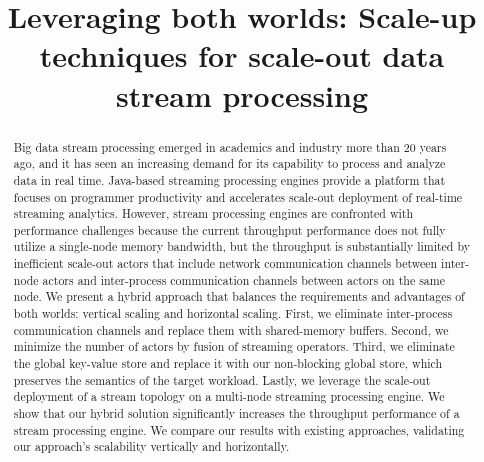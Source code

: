 \documentclass[runningheads]{llncs}
\begin{document}
%
\title{Leveraging both worlds: Scale-up techniques for scale-out data stream
processing}
%
%
%
\maketitle              %
%
\begin{abstract}
Big data stream processing emerged in academics and industry more than 20 years
ago, and it has seen an increasing demand for its capability to process and
analyze data in real time. Java-based streaming processing engines provide a
platform that focuses on programmer productivity and accelerates scale-out
deployment of real-time streaming analytics. However, stream processing engines
are confronted with performance challenges because the current throughput
performance does not fully utilize a single-node memory bandwidth, but the
throughput is substantially limited by inefficient scale-out actors that
include network communication channels between inter-node actors and
inter-process communication channels between actors on the same node. We
present a hybrid approach that balances the requirements and advantages of both
worlds: vertical scaling and horizontal scaling. First, we eliminate
inter-process communication channels and replace them with shared-memory
buffers. Second, we minimize the number of actors by fusion of streaming
operators. Third, we eliminate the global key-value store and replace it with
our non-blocking global store, which preserves the semantics of the target
workload. Lastly, we leverage the scale-out deployment of a stream topology on
a multi-node streaming processing engine. We show that our hybrid solution
significantly increases the throughput performance of a stream processing
engine. We compare our results with existing approaches, validating our
approach's scalability vertically and horizontally.

\end{abstract}
%
%
%
\end{document}

